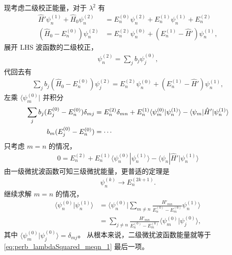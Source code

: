 现考虑二级校正能量，对于 $\lambda^2$ 有
\begin{align}
    \hat H' \psi_n^{(1)} + \hat H_0 \psi_n^{(2)} &= E_n^{(0)} \psi_n^{(2)} +E_n^{(1)} \psi_n^{(1)} + E_n^{(2)} \\
    (\hat H_0 - E_n^{(0)}) \psi_n^{(2)} &= E_n^{(2)} \psi_n^{(0)} + (E_n^{(1)} - \hat H') \psi_n^{(1)}, 
\end{align}
展开 LHS 波函数的二级校正，
\begin{align}
    \psi_n^{(2)} = \sum_j b_j \psi_j^{(0)},
\end{align}
代回去有
\begin{align}
    \sum_j b_j (\hat H_0 - E_n^{(0)}) \psi_j^{(2)} = E_n^{(2)} \psi_n^{(0)} + (E_n^{(1)} - \hat H') \psi_n^{(1)},
\end{align}
左乘 $\langle \psi_m^{(0)}|$ 并积分
\begin{align}
    \sum_j b_j (E_j^{(0)} - E_n^{(0)}) \delta_{mj} &= E_n^{(2)} \delta_{mn} + E_n^{(1)} \langle \psi_m^{(0)} | \psi_n^{(1)} \rangle - \langle \psi_m | \hat H' | \psi_n^{(1)} \rangle \notag \\
    b_m (E_j^{(0)} - E_n^{(0)}) &= \cdots
\end{align}
只考虑 $m=n$ 的情况，
\begin{align}
    0 = E_n^{(2)}  + E_n^{(1)} \langle \psi_n^{(0)} | \psi_n^{(1)} \rangle - \langle \psi_n | \hat H' | \psi_n^{(1)} \rangle
    \label{eq:perb_lambdaSquared_meqn_1}
\end{align}
由一级微扰波函数可知三级微扰能量，更普适的定理是
\begin{align}
    \psi_n^{(k)} \rightarrow E_n^{(2k+1)}. 
\end{align}
继续求解 $m=n$ 的情况，
\begin{align}
    \langle \psi_n^{(0)} | \psi_n^{(1)} \rangle
    & = \langle \psi_n^{(0)} | \sum_{m\neq n}\frac{H'_{mn}}{E_n^{(0)} - E_m^{(0)}} \psi_n^{(1)} \rangle \\
    & = \sum_{j\neq n}\frac{H'_{mn}}{E_n^{(0)} - E_m^{(0)}} \langle \psi_m^{(0)} | \psi_j^{(0)} \rangle, 
\end{align}
其中 $\langle \psi_m^{(0)} | \psi_j^{(0)} \rangle = \delta_{mj}$。
从根本来说，二级微扰波函数能量就等于 \eqref{eq:perb_lambdaSquared_meqn_1} 最后一项。

